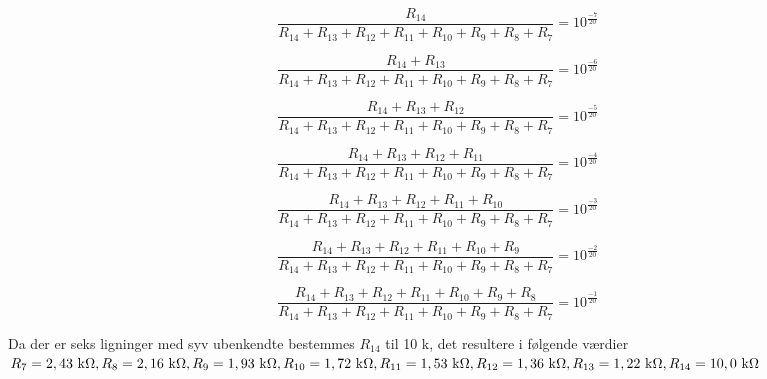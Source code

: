 \begin{equation}
\label{beregning-af-analog-attenuator-ligning6}
\frac{R_{14}}{R_{14} + R_{13} + R_{12} + R_{11} + R_{10} + R_{9} + R_{8} + R_{7}} = 10^{\frac{-7}{20}}
\end{equation}

\begin{equation}
\frac{R_{14} + R_{13}}{R_{14} + R_{13} + R_{12} + R_{11} + R_{10} + R_{9} + R_{8} + R_{7}} = 10^{\frac{-6}{20}}
\end{equation}

\begin{equation}
\frac{R_{14} + R_{13} + R_{12}}{R_{14} + R_{13} + R_{12} + R_{11} + R_{10} + R_{9} + R_{8} + R_{7}} = 10^{\frac{-5}{20}}
\end{equation}

\begin{equation}
\frac{R_{14} + R_{13} + R_{12} + R_{11}}{R_{14} + R_{13} + R_{12} + R_{11} + R_{10} + R_{9} + R_{8} + R_{7}} = 10^{\frac{-4}{20}}
\end{equation}

\begin{equation}
\frac{R_{14} + R_{13} + R_{12} + R_{11} + R_{10}}{R_{14} + R_{13} + R_{12} + R_{11} + R_{10} + R_{9} + R_{8} + R_{7}} = 10^{\frac{-3}{20}}
\end{equation}

\begin{equation}
\frac{R_{14} + R_{13} + R_{12} + R_{11} + R_{10} + R_{9}}{R_{14} + R_{13} + R_{12} + R_{11} + R_{10} + R_{9} + R_{8} + R_{7}} = 10^{\frac{-2}{20}}
\end{equation}

\begin{equation}
\label{beregning-af-analog-attenuator-ligning12}
\frac{R_{14} + R_{13} + R_{12} + R_{11} + R_{10} + R_{9} + R_{8}}{R_{14} + R_{13} + R_{12} + R_{11} + R_{10} + R_{9} + R_{8} + R_{7}} = 10^{\frac{-1}{20}}
\end{equation}

Da der er seks ligninger med syv ubenkendte bestemmes $R_{14}$ til 10 k\ohm, det resultere i følgende værdier 
$R_{7} = 2,43 ~\mathrm{k}\ohm, R_{8} = 2,16 ~\mathrm{k}\ohm, R_{9} = 1,93 ~\mathrm{k}\ohm, R_{10} = 1,72 ~\mathrm{k}\ohm, R_{11} = 1,53 ~\mathrm{k}\ohm, R_{12} = 1,36 ~\mathrm{k}\ohm, R_{13} = 1,22 ~\mathrm{k}\ohm, R_{14} = 10,0 ~\mathrm{k}\ohm$ 